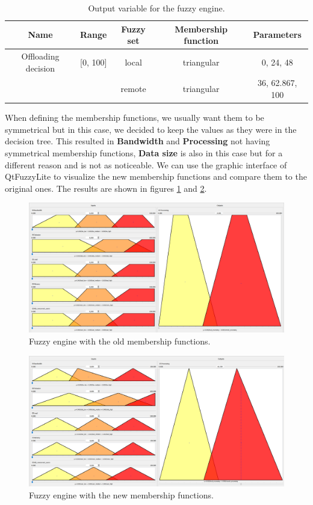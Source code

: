 \begin{table}[H]
	\centering
	\begin{tabular}{|c|c|c|c|c|}
		\hline
		Name                & Range    & Fuzzy set & Membership function & Parameters      \\
		\hline
		Offloading decision & [0, 100] & local     & triangular          & 0, 24, 48       \\
		                    &          & remote    & triangular          & 36, 62.867, 100 \\
		\hline
	\end{tabular}
	\caption{Output variable for the fuzzy engine.}
	\label{tab:new-fuzzy-output}
\end{table}

When defining the membership functions, we usually want them to be symmetrical but in this case, we decided to keep the
values as they were in the decision tree. This resulted in \textbf{Bandwidth} and \textbf{Processing} not having
symmetrical membership functions, \textbf{Data size} is also in this case but for a different reason and is not as
noticeable. We can use the graphic interface of QtFuzzyLite to visualize the new membership functions and compare them
to the original ones. The results are shown in figures \ref{fig:old-fuzzy-engine} and \ref{fig:new-fuzzy-engine}.

\begin{figure}[H]
	\centering
	\includegraphics[width=1\textwidth]{../images/old-vars.png}
	\caption{Fuzzy engine with the old membership functions.}
	\label{fig:old-fuzzy-engine}
\end{figure}

\begin{figure}[H]
	\centering
	\includegraphics[width=1\textwidth]{../images/new-vars.png}
	\caption{Fuzzy engine with the new membership functions.}
	\label{fig:new-fuzzy-engine}
\end{figure}